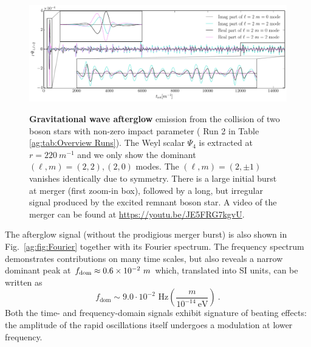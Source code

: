 \begin{figure}[h!]
\begin{center}{
{\includegraphics[width=1.0\columnwidth]{ag_fig/AllModes.pdf}} }
\caption{{\bf Gravitational wave afterglow} emission from the collision of two boson stars with non-zero impact parameter ( Run 2 in Table \ref{ag:tab:Overview Runs}). The Weyl scalar $\Psi_4$ is extracted at $r=220~m^{-1}$ and we only show the dominant $(\ell,m)=(2,2),(2,0)$ modes. The $(\ell,m)=(2,\pm1)$ vanishes identically due to symmetry. There is a large initial burst at merger (first zoom-in box), followed by a long, but irregular signal produced by the excited remnant boson star.  A video of the merger can be found at \url{https://youtu.be/JE5FRG7kgvU}.
 }

\label{ag:fig:GW_signal}
\end{center}
\end{figure}


The afterglow signal (without the prodigious merger burst)
is also shown in Fig.~\ref{ag:fig:Fourier} together with
its Fourier spectrum. The frequency spectrum demonstrates
contributions on many time scales, but also reveals a
narrow dominant peak at $f_{\rm dom}\approx
0.6\times 10^{-2}~m$ which, translated into SI units, can
be written as
\begin{equation}
    f_{\textrm{dom}} \sim 9.0 \cdot 10^{-2}\text{ Hz} \left( \frac{m}{10^{-14}~\text{eV}}
    \right)~. \label{ag:eqn:freqGW}
\end{equation}
Both the time- and frequency-domain signals exhibit signature
of beating effects: the amplitude of the rapid oscillations
itself undergoes a modulation at lower frequency.



